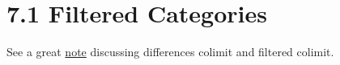 \section{7.1 Filtered Categories}

See a great \href{https://www.google.com/url?sa=t&rct=j&q=&esrc=s&source=web&cd=&cad=rja&uact=8&ved=2ahUKEwjTraKFt82EAxXRADQIHTeMC2AQFnoECBEQAQ&url=https%3A%2F%2Fbcourses.berkeley.edu%2Ffiles%2F70867162%2Fdownload%3Fdownload_frd%3D1%26verifier%3DL0iwTVSL0xTwBIibd2QLxZ33Pe5bBapERdxNhhAv&usg=AOvVaw2kzyLiZqE4HbUrltEmncWq&opi=89978449}{note} discussing differences colimit and filtered colimit.
